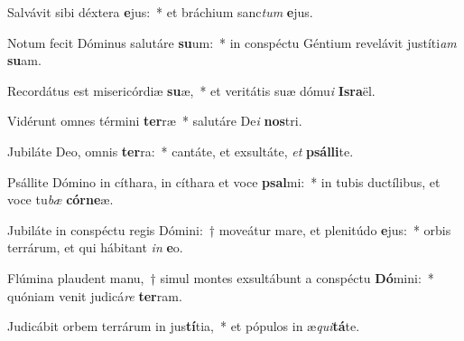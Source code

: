 \item Salvávit sibi déxtera \textbf{e}jus:~* et bráchium sanc\textit{tum} \textbf{e}jus.
\item Notum fecit Dóminus salutáre \textbf{su}um:~* in conspéctu Géntium revelávit justíti\textit{am} \textbf{su}am.
\item Recordátus est misericórdiæ \textbf{su}æ,~* et veritátis suæ dómu\textit{i} \textbf{Is}\textbf{ra}ël.
\item Vidérunt omnes términi \textbf{ter}ræ~* salutáre De\textit{i} \textbf{nos}tri.
\item Jubiláte Deo, omnis \textbf{ter}ra:~* cantáte, et exsultáte, \textit{et} \textbf{psál}\textbf{li}te.
\item Psállite Dómino in cíthara, in cíthara et voce \textbf{psal}mi:~* in tubis ductílibus, et voce tu\textit{bæ} \textbf{cór}\textbf{ne}æ.
\item Jubiláte in conspéctu regis Dómini:~† moveátur mare, et plenitúdo \textbf{e}jus:~* orbis terrárum, et qui hábitant \textit{in} \textbf{e}o.
\item Flúmina plaudent manu,~† simul montes exsultábunt a conspéctu \textbf{Dó}mini:~* quóniam venit judicá\textit{re} \textbf{ter}ram.
\item Judicábit orbem terrárum in jus\textbf{tí}tia,~* et pópulos in æ\textit{qui}\textbf{tá}te.
